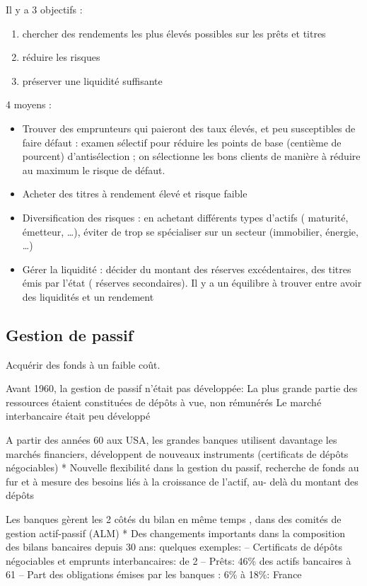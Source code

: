 	Il y a 3 objectifs :
	
	\begin{enumerate}
		\item chercher des rendements les plus élevés possibles sur les prêts et titres 
		\item réduire les risques 
		\item préserver une liquidité suffisante
	\end{enumerate}
	
	4 moyens :
	
	\begin{itemize}
		\item Trouver des emprunteurs qui paieront des taux élevés, et peu susceptibles 
de faire défaut : examen sélectif pour réduire les points de base (centième de pourcent) d'antisélection ; on sélectionne les bons clients de manière à réduire au maximum le risque de défaut.
		\item Acheter des titres à rendement élevé et risque faible
		\item Diversification des risques : en achetant différents types d'actifs ( maturité, 
émetteur, \dots), éviter de trop se spécialiser sur un secteur (immobilier, 
énergie, \dots) 
		\item Gérer la liquidité : décider du montant des réserves excédentaires, des titres 
émis par l’état ( réserves secondaires). Il y a un équilibre à trouver entre avoir des liquidités et un rendement
	\end{itemize}
	
	\subsection{Gestion de passif}
	
	Acquérir des fonds à un faible coût.
	
	Avant 1960, la gestion de passif n’était pas développée: 
	La plus grande partie des ressources étaient constituées de dépôts à vue, 
non rémunérés 
 Le marché interbancaire était peu développé 

A partir des années 60 aux USA, les grandes banques utilisent davantage 
les marchés financiers, développent de nouveaux instruments (certificats de 
dépôts négociables) 
* Nouvelle flexibilité dans la gestion du passif, recherche de fonds au fur et à 
mesure des besoins liés à la croissance de l’actif, au- delà du montant des 
dépôts 

Les banques gèrent les 2 côtés du bilan en même 
temps , dans des comités de gestion actif-passif 
(ALM) 
* Des changements importants dans la composition 
des bilans bancaires depuis 30 ans: quelques 
exemples: 
– Certificats de dépôts négociables et emprunts 
interbancaires: de 2%
– Prêts: 46\% des actifs bancaires à 61%
– Part des obligations émises par les banques : 6\% à 
18\%: France 

